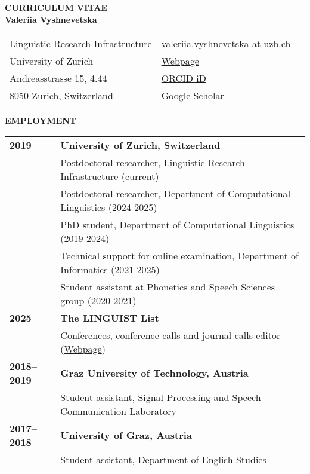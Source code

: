 \documentclass[11pt]{article}
\begin{document}
\begin{center}
{\bf CURRICULUM VITAE\\Valeriia Vyshnevetska}\\
\vskip 12pt






\begin{tabular}{ll}
Linguistic Research Infrastructure & valeriia.vyshnevetska at uzh.ch \\
University of Zurich & \href{https://www.liri.uzh.ch/en/aboutus/Valeriia-Vyshnevetska.html}{Webpage} \\ 
Andreasstrasse 15, 4.44 & \href{https://orcid.org/0009-0003-3355-9580}{ORCID iD} \\
8050 Zurich, Switzerland & \href{https://scholar.google.com/citations?user=9IiY_w8AAAAJ&hl=ru}{Google Scholar} \\
\end{tabular}
\end{center}





\vskip 12pt
\begin{flushleft}
{\bf EMPLOYMENT}
\end{flushleft}
\begin{tabular}{lp{5.5in}}
\bf 2019-- & {\bf University of Zurich, Switzerland} \\
& Postdoctoral researcher, \href{https://www.liri.uzh.ch/}{Linguistic Research Infrastructure }(current) \\

& Postdoctoral researcher, Department of Computational Linguistics (2024-2025) \\
& PhD student, Department of Computational Linguistics (2019-2024) \\
& Technical support for online examination, Department of Informatics (2021-2025) \\
& Student assistant at Phonetics and Speech Sciences group (2020-2021) \\
\bf 2025-- & {\bf The LINGUIST List} \\
& Conferences, conference calls and journal calls editor (\href{https://linguistlist.org/}{Webpage}) \\
\bf 2018--2019 & {\bf Graz University of Technology, Austria} \\
& Student assistant, Signal Processing and Speech Communication Laboratory \\
\bf 2017--2018 & {\bf University of Graz, Austria} \\
& Student assistant, Department of English Studies \\
\end{tabular}
\end{document}
